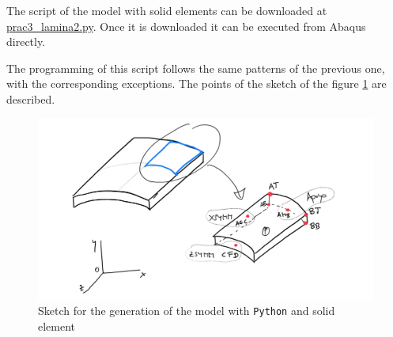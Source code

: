 \documentclass[english,a4paper,12pt]{article}
\begin{document}
The script of the model with solid elements can be downloaded at \href{http://stokes.mecanica.upm.es/MCIC_open/practicas/scripts-python/prac3_lamina2.py}{\ttfamily prac3\_lamina2.py}. Once it is downloaded it can be executed from Abaqus directly.

The programming of this script follows the same patterns of the previous one, with the corresponding exceptions. The points of the sketch of the figure \ref{fig:lamina2} are described.

\begin{figure}
\centering
	\includegraphics[scale=0.25]{figs/prac3_lamina2_fig.png}
	\caption{Sketch for the generation of the model with \texttt{Python} and solid element }
	\label{fig:lamina2}
\end{figure}
\end{document}
